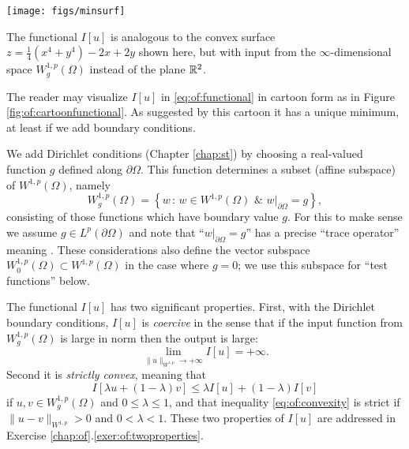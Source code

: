 \begin{marginfigure}
\texttt{[image: figs/minsurf]} %
\medskip
\caption{The functional $I[u]$ is analogous to the convex surface $z = \tfrac{1}{4}(x^4 + y^4) - 2x + 2y$ shown here, but with input from the $\infty$-dimensional space $W_g^{1,p}(\Omega)$ instead of the plane $\mathbb{R}^2$.}
\label{fig:of:cartoonfunctional}
\end{marginfigure}

The reader may visualize $I[u]$ in \eqref{eq:of:functional} in cartoon form as in Figure \ref{fig:of:cartoonfunctional}.  As suggested by this cartoon it has a unique minimum, at least if we add boundary conditions.

We add Dirichlet conditions (Chapter \ref{chap:st}) by choosing a real-valued function $g$ defined along $\partial \Omega$.  This function determines a subset (affine subspace) of $W^{1,p}(\Omega)$, namely
\begin{equation}
    W_g^{1,p}(\Omega) = \left\{w \,:\, w \in W^{1,p}(\Omega) \,\, \& \,\, w\big|_{\partial \Omega} = g\right\},  \label{eq:of:affinedirichlet}
\end{equation}
consisting of those functions which have boundary value $g$.  For this to make sense we assume $g \in L^p(\partial \Omega)$ and note that ``$w\big|_{\partial \Omega} = g$'' has a precise ``trace operator'' meaning \citep[section 5.5]{Evans2010}.  These considerations also define the vector subspace $W_0^{1,p}(\Omega) \subset W^{1,p}(\Omega)$ in the case where $g=0$; we use this subspace for ``test functions'' below.

The functional $I[u]$ has two significant properties.  First, with the Dirichlet boundary conditions, $I[u]$ is \emph{coercive} in the sense that if the input function from $W_g^{1,p}(\Omega)$ is large in norm then the output is large:
\begin{equation}
\lim_{\|u\|_{W^{1,p}} \to +\infty} I[u] = +\infty.   \label{eq:of:coercivity}
\end{equation}
Second it is \emph{strictly convex}, meaning that
\begin{equation}
I[\lambda u + (1-\lambda) v] \le \lambda I[u] + (1-\lambda) I[v]    \label{eq:of:convexity}
\end{equation}
if $u,v\in W_g^{1,p}(\Omega)$ and $0 \le \lambda \le 1$, and that inequality \eqref{eq:of:convexity} is strict if $\|u-v\|_{W^{1,p}} > 0$ and $0 < \lambda < 1$.
These two properties of $I[u]$ are addressed in Exercise \ref{chap:of}.\ref{exer:of:twoproperties}.

